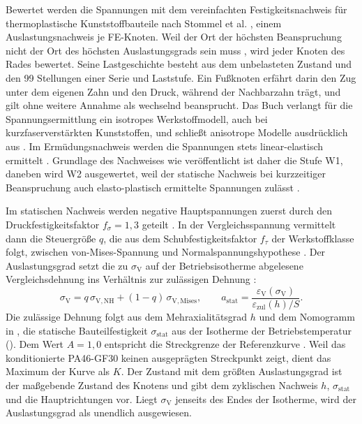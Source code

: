 Bewertet werden die Spannungen mit dem vereinfachten Festigkeitsnachweis für thermoplastische Kunststoffbauteile nach Stommel et al. \cite[Kap.~6]{Sto18}, einem Auslastungsnachweis je FE-Knoten. Weil der Ort der höchsten Beanspruchung nicht der Ort des höchsten Auslastungsgrads sein muss \cite[S.~313]{Sto18}, wird jeder Knoten des Rades bewertet. Seine Lastgeschichte besteht aus dem unbelasteten Zustand und den 99 Stellungen einer Serie und Laststufe. Ein Fußknoten erfährt darin den Zug unter dem eigenen Zahn und den Druck, während der Nachbarzahn trägt, und gilt ohne weitere Annahme als wechselnd beansprucht. Das Buch verlangt für die Spannungsermittlung ein isotropes Werkstoffmodell, auch bei kurzfaserverstärkten Kunststoffen, und schließt anisotrope Modelle ausdrücklich aus \cite[S.~343 bis 344]{Sto18}. Im Ermüdungsnachweis werden die Spannungen stets linear-elastisch ermittelt \cite[S.~362]{Sto18}. Grundlage des Nachweises wie veröffentlicht ist daher die Stufe W1, daneben wird W2 ausgewertet, weil der statische Nachweis bei kurzzeitiger Beanspruchung auch elasto-plastisch ermittelte Spannungen zulässt \cite[S.~343]{Sto18}.

Im statischen Nachweis werden negative Hauptspannungen zuerst durch den Druckfestigkeitsfaktor $f_{\sigma} = 1{,}3$ geteilt \cite[S.~357]{Sto18}. In der Vergleichsspannung vermittelt dann die Steuergröße $q$, die aus dem Schubfestigkeitsfaktor $f_{\tau}$ der Werkstoffklasse folgt, zwischen von-Mises-Spannung und Normalspannungshypothese \cite[S.~322 und 357]{Sto18}. Der Auslastungsgrad setzt die zu $\sigma_{\mathrm{V}}$ auf der Betriebsisotherme abgelesene Vergleichsdehnung ins Verhältnis zur zulässigen Dehnung \cite[S.~355]{Sto18}:
\begin{equation}
    \sigma_{\mathrm{V}} = q\,\sigma_{\mathrm{V,NH}} + (1 - q)\,\sigma_{\mathrm{V,Mises}} , \qquad
    a_{\mathrm{stat}} = \frac{\varepsilon_{\mathrm{V}}(\sigma_{\mathrm{V}})}{\varepsilon_{\mathrm{zul}}(h)/S} .
    \label{eq:a_stat}
\end{equation}
Die zulässige Dehnung folgt aus dem Mehraxialitätsgrad $h$ und dem Nomogramm in , die statische Bauteilfestigkeit $\sigma_{\mathrm{stat}}$ aus der Isotherme der Betriebstemperatur (). Dem Wert $A = 1{,}0$ entspricht die Streckgrenze der Referenzkurve \cite[S.~346 und 349]{Sto18}. Weil das konditionierte PA46-GF30 keinen ausgeprägten Streckpunkt zeigt, dient das Maximum der Kurve als $K$. Der Zustand mit dem größten Auslastungsgrad ist der maßgebende Zustand des Knotens und gibt dem zyklischen Nachweis $h$, $\sigma_{\mathrm{stat}}$ und die Hauptrichtungen vor. Liegt $\sigma_{\mathrm{V}}$ jenseits des Endes der Isotherme, wird der Auslastungsgrad als unendlich ausgewiesen.

